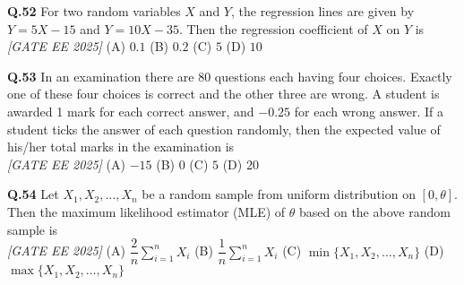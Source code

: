 \documentclass[11pt]{article}
\begin{document}
\begin{flushleft}
\textbf{Q.52} For two random variables $X$ and $Y$, the regression lines are given by $Y = 5X - 15$ and $Y = 10X - 35$. Then the regression coefficient of $X$ on $Y$ is 
\\[1ex] \textit{[GATE EE 2025]}
\newline
(A) $0.1$ \hspace{2em}
(B) $0.2$ \hspace{2em}
(C) $5$ \hspace{2em}
(D) $10$ \newline
\end{flushleft}

\begin{flushleft}
\textbf{Q.53} In an examination there are 80 questions each having four choices. Exactly one of these four choices is correct and the other three are wrong. A student is awarded 1 mark for each correct answer, and $-0.25$ for each wrong answer. If a student ticks the answer of each question randomly, then the expected value of his/her total marks in the examination is 
\\[1ex] \textit{[GATE EE 2025]}
\newline
(A) $-15$ \hspace{2em}
(B) $0$ \hspace{2em}
(C) $5$ \hspace{2em}
(D) $20$ \newline
\end{flushleft}

\begin{flushleft}
\textbf{Q.54} Let $X_1, X_2, \dots, X_n$ be a random sample from uniform distribution on $[0, \theta]$. Then the maximum likelihood estimator (MLE) of $\theta$ based on the above random sample is 
\\[1ex] \textit{[GATE EE 2025]}
\newline
(A) $\dfrac{2}{n} \sum_{i=1}^{n} X_i$ \hspace{2em}
(B) $\dfrac{1}{n} \sum_{i=1}^{n} X_i$ \newline
(C) $\min\{X_1, X_2, \dots, X_n\}$ \hspace{2em}
(D) $\max\{X_1, X_2, \dots, X_n\}$ \newline
\end{flushleft}
\end{document}
